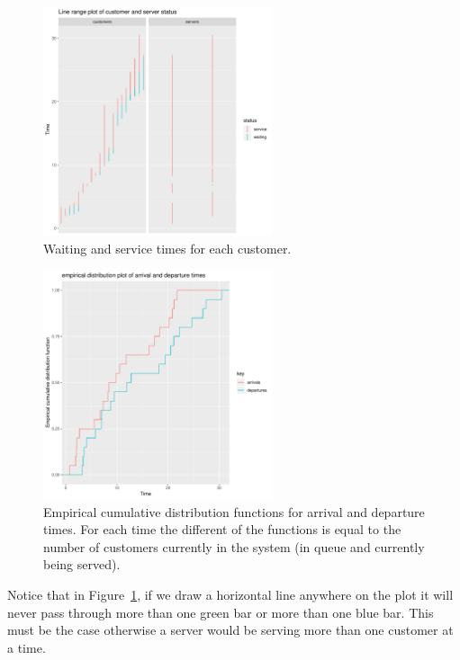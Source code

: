 \documentclass[article]{jss}
\begin{document}
\begin{figure}[!htb]
\centering
\includegraphics[width = 0.6\textwidth]{Figures/customers_083.pdf}
\caption{Waiting and service times for each customer. }
\label{fig:customers}
\end{figure}

\begin{figure}[!htb]
\centering
\includegraphics[width = 0.6\textwidth]{Figures/ecdf_083.pdf}
\caption{Empirical cumulative distribution functions for arrival and departure times. For each time the different of the functions is equal to the number of customers currently in the system (in queue and currently being served).}
\label{fig:ecdf}
\end{figure}

Notice that in Figure~\ref{fig:customers}, if we draw a horizontal line anywhere on the plot it will never pass through more than one green bar or more than one blue bar. This must be the case otherwise a server would be serving more than one customer at a time.
\end{document}
